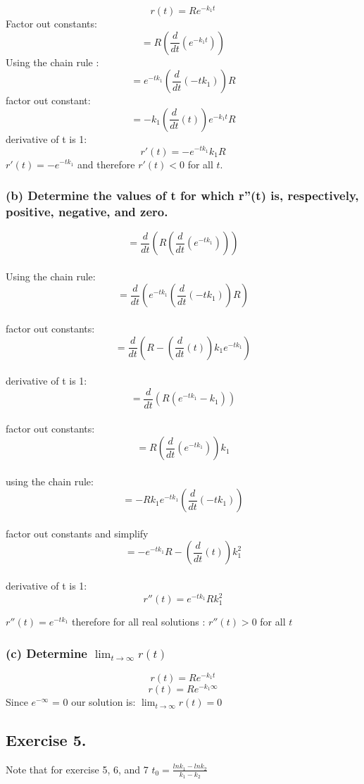 \documentclass[]{article}
\begin{document}
\[r(t) = Re^{-k_1t}\] Factor out constants:
\[=R(\frac{d}{dt}(e^{-k_1 t}))\] Using the chain rule :
\[= e^{-tk_1}(\frac{d}{dt}(-tk_1))R\] factor out constant:
\[=-k_1 (\frac{d}{dt}(t))e^{-k_1 t}R\] derivative of t is 1:
\[r'(t)= -e^{-tk_1}k_1R\] \(r'(t) = -e^{-t k_1}\) and therefore
\(r'(t) < 0\) for all \(t\).

\subsubsection{(b) Determine the values of t for which r''(t) is,
respectively, positive, negative, and
zero.}\label{b-determine-the-values-of-t-for-which-rt-is-respectively-positive-negative-and-zero.}

\[= \frac{d}{dt}(R(\frac{d}{dt}(e^{-tk_1})))\]\\
Using the chain rule:
\[= \frac{d}{dt}(e^{-tk_1}(\frac{d}{dt}(-tk_1))R)\]\\
factor out constants:
\[= \frac{d}{dt}(R -(\frac{d}{dt}(t))k_1 e^{-tk_1})\]\\
derivative of t is 1: \[= \frac{d}{dt}(R(e^{-tk_1}-k_1))\]\\
factor out constants: \[= R(\frac{d}{dt}(e^{-tk_1}))k_1\]\\
using the chain rule: \[= -Rk_1e^{-tk_1}(\frac{d}{dt}(-tk_1))\]\\
factor out constants and simplify
\[= -e^{-tk_1}R-(\frac{d}{dt}(t))k_1^2\]\\
derivative of t is 1: \[r''(t)= e^{-tk_1}Rk_1^2\]

\(r''(t) = e^{-t k_1}\) therefore for all real solutions :
\(r''(t) > 0\) for all \(t\)

\subsubsection{\texorpdfstring{(c) Determine
\(\lim_{t\to\infty}r(t)\)}{(c) Determine \textbackslash{}lim\_\{t\textbackslash{}to\textbackslash{}infty\}r(t)}}\label{c-determine-lim_ttoinftyrt}

\[r(t) = Re^{-k_1t}\] \[r(t) = Re^{-k_1 \infty}\] Since \(e^{-\infty}\)
= 0 our solution is: \(\lim_{t\to\infty}r(t) =0\)

\subsection{Exercise 5.}\label{exercise-5.}

Note that for exercise 5, 6, and 7
\(t_0 = \frac{ln k_1 - ln k_2}{k_1 - k_2}\)
\end{document}
